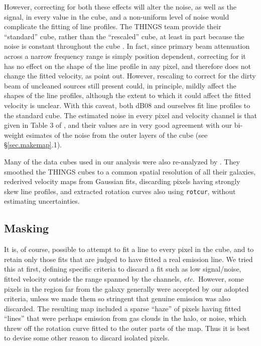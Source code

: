 \documentclass[letterpaper,fleqn,usenatbib]{mnras}
\def\etc{{\it etc.}}
\def\rtc{{\tt rotcur}}
\begin{document}
However, correcting for both these effects will alter the noise, as
well as the signal, in every value in the cube, and a non-uniform
level of noise would complicate the fitting of line profiles.  The
THINGS team provide their ``standard'' cube, rather than the
``rescaled'' cube, at least in part because the noise is constant
throughout the cube \citep{Wa08}.  In fact, since primary beam
attenuation across a narrow frequency range is simply position
dependent, correcting for it has no effect on the shape of the line
profile in any pixel, and therefore does not change the fitted
velocity, as \citet{Wa08} point out.  However, rescaling to correct
for the dirty beam of uncleaned sources still present could, in
principle, mildly affect the shapes of the line profiles, although the
extent to which it could affect the fitted velocity is unclear.  With
this caveat, both dB08 and ourselves fit line profiles to the standard
cube.  The estimated noise in every pixel and velocity channel is that
given in Table 3 of \citet{Wa08}, and their values are in very good
agreement with our bi-weight esimates of the noise from the outer
layers of the cube (see \S\ref{sec.makemap}.1).

Many of the data cubes used in our analysis were also re-analyzed by
\citet{Po16}.  They smoothed the THINGS cubes to a common spatial
resolution of all their galaxies, rederived velocity maps from
Gaussian fits, discarding pixels having strongly skew line profiles,
and extracted rotation curves also using \rtc, without estimating
uncertainties.

\subsection{Masking}
\label{sec.setmask}
It is, of course, possible to attempt to fit a line to every pixel in
the cube, and to retain only those fits that are judged to have fitted
a real emission line.  We tried this at first, defining specific
criteria to discard a fit such as low signal/noise, fitted velocity
outside the range spanned by the channels, \etc \ However, some pixels
in the region far from the galaxy generally were accepted by our
adopted criteria, unless we made them so stringent that genuine
emission was also discarded.  The resulting map included a sparse
``haze'' of pixels having fitted ``lines'' that were perhaps emission
from gas clouds in the halo, or noise, which threw off the rotation
curve fitted to the outer parts of the map.  Thus it is best to devise
some other reason to discard isolated pixels.
\end{document}
